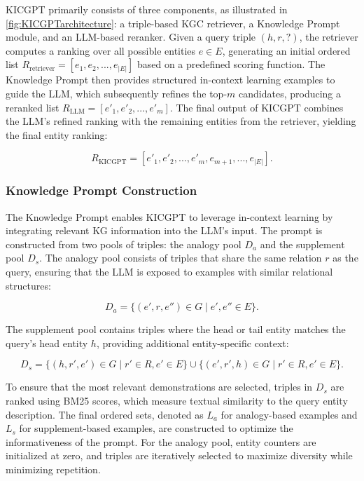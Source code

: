 \documentclass[12pt,a4paper]{article}
\begin{document}
KICGPT primarily consists of three components, as illustrated in \cref{fig:KICGPTarchitecture}: a triple-based KGC retriever, a Knowledge Prompt module, and an LLM-based reranker. Given a query triple \( (h, r, ?) \), the retriever computes a ranking over all possible entities \( e \in E \), generating an initial ordered list \( R_{\text{retriever}} = [e_1, e_2, ..., e_{|E|}] \) based on a predefined scoring function. The Knowledge Prompt then provides structured in-context learning examples to guide the LLM, which subsequently refines the top-\( m \) candidates, producing a reranked list \( R_{\text{LLM}} = [e'_1, e'_2, ..., e'_m] \).
The final output of KICGPT combines the LLM’s refined ranking with the remaining entities from the retriever, yielding the final entity ranking:

\[
R_{\text{KICGPT}} = [e'_1, e'_2, ..., e'_m, e_{m+1}, ..., e_{|E|}].
\]

\subsubsection{Knowledge Prompt Construction}

The Knowledge Prompt enables KICGPT to leverage in-context learning by integrating relevant KG information into the LLM’s input. The prompt is constructed from two pools of triples: the analogy pool \( D_a \) and the supplement pool \( D_s \). The analogy pool consists of triples that share the same relation \( r \) as the query, ensuring that the LLM is exposed to examples with similar relational structures:

\[
D_a = \{(e', r, e'') \in G \mid e', e'' \in E\}.
\]

The supplement pool contains triples where the head or tail entity matches the query's head entity \( h \), providing additional entity-specific context:

\[
D_s = \{(h, r', e') \in G \mid r' \in R, e' \in E\} \cup \{(e', r', h) \in G \mid r' \in R, e' \in E\}.
\]

To ensure that the most relevant demonstrations are selected, triples in \( D_s \) are ranked using BM25 scores, which measure textual similarity to the query entity description.
The final ordered sets, denoted as \( L_a \) for analogy-based examples and \( L_s \) for supplement-based examples, are constructed to optimize the informativeness of the prompt.
For the analogy pool, entity counters are initialized at zero, and triples are iteratively selected to maximize diversity while minimizing repetition.
\end{document}
